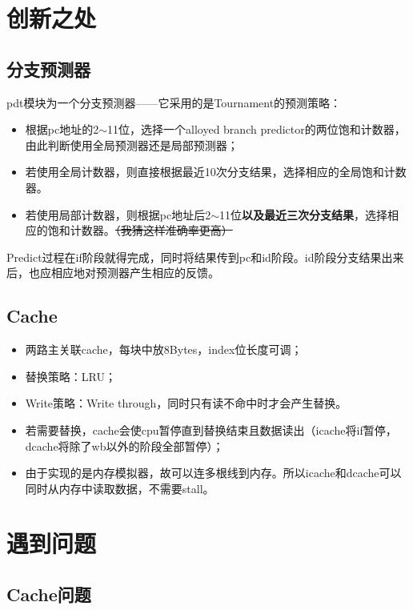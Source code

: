 \documentclass[11pt]{article}
\begin{document}
\section{创新之处}
\label{sec:创新之处}

\subsection{分支预测器}
\label{sec:分支预测器}

pdt模块为一个分支预测器——它采用的是Tournament的预测策略：
\begin{itemize}
\item 根据pc地址的2$\sim$11位，选择一个alloyed branch predictor的两位饱和计数器，由此判断使用全局预测器还是局部预测器；
\item 若使用全局计数器，则直接根据最近10次分支结果，选择相应的全局饱和计数器。
\item 若使用局部计数器，则根据pc地址后2$\sim$11位\textbf{以及最近三次分支结果}，选择相应的饱和计数器。\sout{（我猜这样准确率更高）}
\end{itemize}
Predict过程在if阶段就得完成，同时将结果传到pc和id阶段。id阶段分支结果出来后，也应相应地对预测器产生相应的反馈。

\subsection{Cache}
\label{sec:Cache}
\begin{itemize}
\item 两路主关联cache，每块中放8Bytes，index位长度可调；
\item 替换策略：LRU；
\item Write策略：Write through，同时只有读不命中时才会产生替换。
\item 若需要替换，cache会使cpu暂停直到替换结束且数据读出（icache将if暂停，dcache将除了wb以外的阶段全部暂停）；
\item 由于实现的是内存模拟器，故可以连多根线到内存。所以icache和dcache可以同时从内存中读取数据，不需要stall。
\end{itemize}
\section{遇到问题}
\label{sec:遇到问题}

\subsection{Cache问题}
\label{sec:Cache问题}
\end{document}
